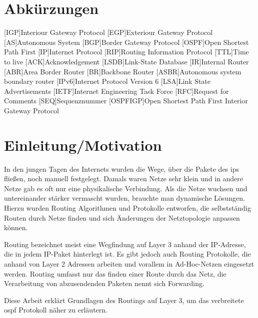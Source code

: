 \documentclass[11pt,a4paper,final]{article}
\begin{document}
\section*{Abkürzungen}
\begin{acronym}
		[IGP]{Interiour Gateway Protocol}
		[EGP]{Exteriour Gateway Protocol}
		[AS]{Autonomous System}
		[BGP]{Border Gateway Protocol}
		{Open Shortest Path First}
		[IP]{Internet Protocol}
		[RIP]{Routing Information Protocol}
		[TTL]{Time to live}
		[ACK]{Acknowledgement}
		{Link-State Database}
		[IR]{Internal Router}
		[ABR]{Area Border Router}
		[BR]{Backbone Router}
		{Autonomous system boundary router}
		{Internet Protocol Version 6}
		[LSA]{Link State Advertisements}
		{Internet Engineering Task Force}
		[RFC]{Request for Comments}
		[SEQ]{Sequenznummer}
		[OSPFIGP]{Open Shortest Path First Interior Gateway Protocol}
\end{acronym}
\newpage
\setcounter{page}{1}

\section{Einleitung/Motivation}
In den jungen Tagen des Internets wurden die Wege, über die Pakete des \ac{ip}s fließen, noch manuell festgelegt.
Damals waren Netze sehr klein und in andere Netze gab es oft nur eine physikalische Verbindung.
Als die Netze wuchsen und untereinander stärker vermascht wurden, brauchte man dynamische Lösungen.
Hierzu wurden Routing Algorithmen und Protokolle entworfen, die selbstständig Routen durch Netze finden und sich Änderungen der Netztopologie anpassen können.

Routing bezeichnet meist eine Wegfindung auf Layer 3 anhand der IP-Adresse, die in jedem IP-Paket hinterlegt ist.
Es gibt jedoch auch Routing Protokolle, die anhand von Layer 2 Adressen arbeiten und vorallem in Ad-Hoc-Netzen eingesetzt werden.
Routing umfasst nur das finden einer Route durch das Netz, die Verarbeitung von abzusendenden Paketen nennt sich Forwarding.
\citep{AndrewS.Tanenbaum2010}

Diese Arbeit erklärt Grundlagen des Routings auf Layer 3, um das verbreitete \ac{ospf} Protokoll näher zu erläutern.
\newpage
\end{document}
